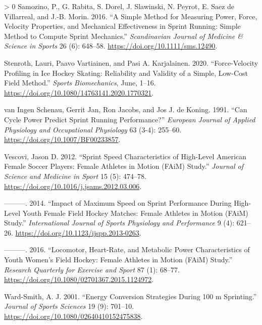 \documentclass[fleqn,10pt,lineno]{wlpeerj} %
\newlength{\cslhangindent}
\newenvironment{CSLReferences}[3] %
 {%
  \setlength{\parindent}{0pt}
  \ifodd #1 \everypar{\setlength{\hangindent}{\cslhangindent}}\ignorespaces\fi
  \ifnum #2 > 0
  \setlength{\parskip}{#2\baselineskip}
  \fi
 }%
 {}
\begin{document}
\begin{CSLReferences}{1}{0}
\leavevmode\hypertarget{ref-samozinoSimpleMethodMeasuring2016}{}%
Samozino, P., G. Rabita, S. Dorel, J. Slawinski, N. Peyrot, E. Saez de Villarreal, and J.-B. Morin. 2016. {``A Simple Method for Measuring Power, Force, Velocity Properties, and Mechanical Effectiveness in Sprint Running: {Simple} Method to Compute Sprint Mechanics.''} \emph{Scandinavian Journal of Medicine \& Science in Sports} 26 (6): 648--58. \url{https://doi.org/10.1111/sms.12490}.

\leavevmode\hypertarget{ref-stenrothForcevelocityProfilingIce2020}{}%
Stenroth, Lauri, Paavo Vartiainen, and Pasi A. Karjalainen. 2020. {``Force-Velocity Profiling in Ice Hockey Skating: Reliability and Validity of a Simple, Low-Cost Field Method.''} \emph{Sports Biomechanics}, June, 1--16. \url{https://doi.org/10.1080/14763141.2020.1770321}.

\leavevmode\hypertarget{ref-vaningenschenauCanCyclePower1991}{}%
van Ingen Schenau, Gerrit Jan, Ron Jacobs, and Jos J. de Koning. 1991. {``Can Cycle Power Predict Sprint Running Performance?''} \emph{European Journal of Applied Physiology and Occupational Physiology} 63 (3-4): 255--60. \url{https://doi.org/10.1007/BF00233857}.

\leavevmode\hypertarget{ref-vescoviSprintSpeedCharacteristics2012}{}%
Vescovi, Jason D. 2012. {``Sprint Speed Characteristics of High-Level {American} Female Soccer Players: {Female Athletes} in {Motion} ({FAiM}) {Study}.''} \emph{Journal of Science and Medicine in Sport} 15 (5): 474--78. \url{https://doi.org/10.1016/j.jsams.2012.03.006}.

\leavevmode\hypertarget{ref-vescoviImpactMaximumSpeed2014}{}%
---------. 2014. {``Impact of {Maximum Speed} on {Sprint Performance During High}-{Level Youth Female Field Hockey Matches}: {Female Athletes} in {Motion} ({FAiM}) {Study}.''} \emph{International Journal of Sports Physiology and Performance} 9 (4): 621--26. \url{https://doi.org/10.1123/ijspp.2013-0263}.

\leavevmode\hypertarget{ref-vescoviLocomotorHeartRateMetabolic2016}{}%
---------. 2016. {``Locomotor, {Heart}-{Rate}, and {Metabolic Power Characteristics} of {Youth Women}'s {Field Hockey}: {Female Athletes} in {Motion} ({FAiM}) {Study}.''} \emph{Research Quarterly for Exercise and Sport} 87 (1): 68--77. \url{https://doi.org/10.1080/02701367.2015.1124972}.

\leavevmode\hypertarget{ref-ward-smithEnergyConversionStrategies2001}{}%
Ward-Smith, A. J. 2001. {``Energy Conversion Strategies During 100 m Sprinting.''} \emph{Journal of Sports Sciences} 19 (9): 701--10. \url{https://doi.org/10.1080/02640410152475838}.


\end{CSLReferences}
\end{document}
